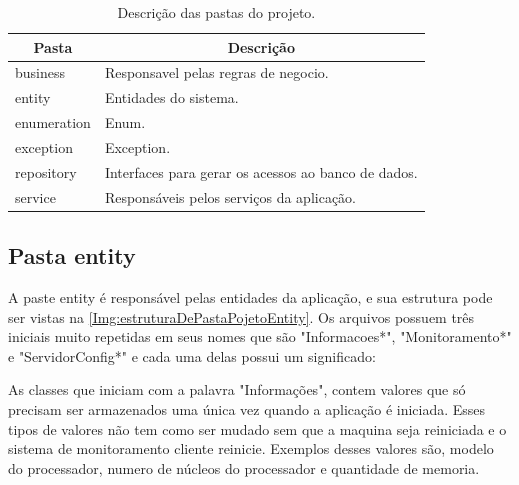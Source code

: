 \begin{table}[!ht]
\centering
\begin{tabular}{|l|l|}
\hline
\multicolumn{1}{|c|}{{\color[HTML]{000000} \textbf{Pasta}}} & \multicolumn{1}{c|}{{\color[HTML]{000000} \textbf{Descrição}}} \\ \hline
business                                                    & Responsavel pelas regras de negocio.                           \\ \hline
entity                                                      & Entidades do sistema.                                          \\ \hline
enumeration                                                 & Enum.                                                          \\ \hline
exception                                                   & Exception.                                                     \\ \hline
repository                                                  & Interfaces para gerar os acessos ao banco de dados.            \\ \hline
service                                                     & Responsáveis pelos serviços da aplicação.                      \\ \hline
\end{tabular}
\caption{Descrição das pastas do projeto.}
\label{Tab:DescricaoDasPastasProjeto}
\end{table}




\subsection{Pasta entity}\label{subsec:PastaEntity}

A paste entity é responsável pelas entidades da aplicação, e sua estrutura pode ser vistas na \autoref{Img:estruturaDePastaPojetoEntity}.
Os arquivos possuem três iniciais muito repetidas em seus nomes que são "Informacoes*", "Monitoramento*" e "ServidorConfig*" e cada uma delas possui um significado:

As classes que iniciam com a palavra "Informações", contem valores que só precisam ser armazenados uma única vez quando a aplicação é iniciada.
Esses tipos de valores não tem como ser mudado sem que a maquina seja reiniciada e o sistema de monitoramento cliente reinicie.
Exemplos desses valores são, modelo do processador, numero de núcleos do processador e quantidade de memoria.

